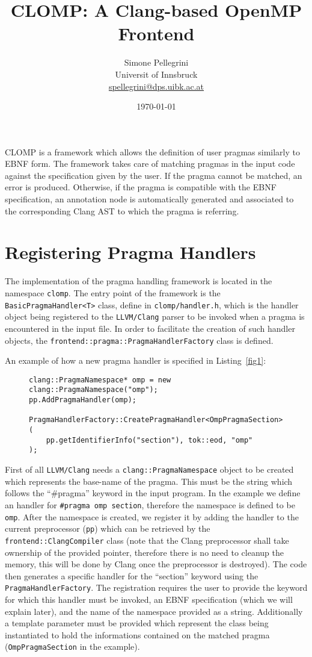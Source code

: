 \documentclass[10pt]{report}
\title{CLOMP: A Clang-based OpenMP Frontend}
\author{
        Simone Pellegrini \\
        Universit of Innsbruck \\
		\url{spellegrini@dps.uibk.ac.at}
}
\date{\today}
\begin{document}
\maketitle

CLOMP is a framework which allows the definition of user pragmas similarly to
EBNF form. The framework takes care of matching pragmas in the input code
against the specification given by the user.  If the pragma cannot be matched,
an error is produced. Otherwise, if the pragma is compatible with the EBNF
specification, an annotation node is automatically generated and associated to
the corresponding Clang AST to which the pragma is referring. 


\section{Registering Pragma Handlers}

The implementation of the pragma handling framework is located in the namespace
{\tt clomp}. The entry point of the framework is the {\tt BasicPragmaHandler<T>}
class, define in {\tt clomp/handler.h}, which is the handler object being
registered to the {\tt LLVM/Clang} parser to be invoked when a pragma is
encountered in the input file. In order to facilitate the creation of such
handler objects, the {\tt frontend::pragma::Pragma\-Hand\-ler\-Factory} class is
defined. 

An example of how a new pragma handler is specified in Listing~\ref{fig1}:

\begin{figure}
\begin{lstlisting}[label=fig1, caption=Specify a pragma handler in Clang]
clang::PragmaNamespace* omp = new clang::PragmaNamespace("omp");
pp.AddPragmaHandler(omp);

PragmaHandlerFactory::CreatePragmaHandler<OmpPragmaSection>(
	pp.getIdentifierInfo("section"), tok::eod, "omp"
);
\end{lstlisting}
\end{figure}

First of all {\tt LLVM/Clang} needs a {\tt clang::PragmaNamespace} object to be
created which represents the base-name of the pragma. This must be the string
which follows the ``\#pragma'' keyword in the input program. In the example we
define an handler for {\tt \#pragma omp section}, therefore the namespace
is defined to be {\tt omp}. After the namespace is created, we register
it by adding the handler to the current preprocessor ({\tt pp}) which can be
retrieved by the {\tt frontend::ClangCompiler} class (note that the Clang
preprocessor shall take ownership of the provided pointer, therefore there is no
need to cleanup the memory, this will be done by Clang once the preprocessor is
destroyed). The code then generates a specific handler for the ``section''
keyword using the {\tt PragmaHandlerFactory}. The registration requires the
user to provide the keyword for which this handler must be invoked, an EBNF
specification (which we will explain later), and the name of the namespace
provided as a string. Additionally a template parameter must be provided which
represent the class being instantiated to hold the informations contained on the
matched pragma ({\tt OmpPragmaSection} in the example). 
\end{document}
